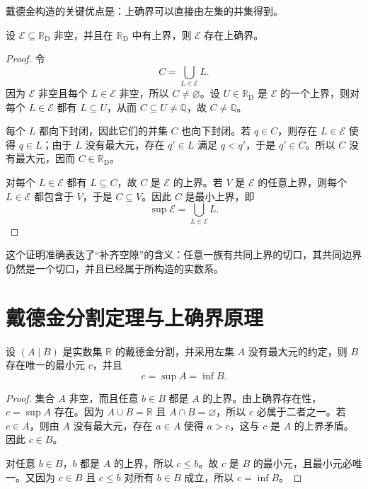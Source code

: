 \documentclass[UTF8,12pt,a4paper,fontset=fandol]{ctexbook}
\begin{document}
戴德金构造的关键优点是：上确界可以直接由左集的并集得到。

\begin{theorem}[上确界存在性]
设 $\mathcal{E}\subseteq\mathbb{R}_{\mathrm D}$ 非空，并且在 $\mathbb{R}_{\mathrm D}$ 中有上界，则 $\mathcal{E}$ 存在上确界。
\end{theorem}

\begin{proof}
令
\[
  C=\bigcup_{L\in\mathcal{E}}L.
\]
因为 $\mathcal{E}$ 非空且每个 $L\in\mathcal{E}$ 非空，所以 $C\ne\varnothing$。设 $U\in\mathbb{R}_{\mathrm D}$ 是 $\mathcal{E}$ 的一个上界，则对每个 $L\in\mathcal{E}$ 都有 $L\subseteq U$，从而 $C\subseteq U\ne\mathbb{Q}$，故 $C\ne\mathbb{Q}$。

每个 $L$ 都向下封闭，因此它们的并集 $C$ 也向下封闭。若 $q\in C$，则存在 $L\in\mathcal{E}$ 使得 $q\in L$；由于 $L$ 没有最大元，存在 $q'\in L$ 满足 $q<q'$，于是 $q'\in C$。所以 $C$ 没有最大元，因而 $C\in\mathbb{R}_{\mathrm D}$。

对每个 $L\in\mathcal{E}$ 都有 $L\subseteq C$，故 $C$ 是 $\mathcal{E}$ 的上界。若 $V$ 是 $\mathcal{E}$ 的任意上界，则每个 $L\in\mathcal{E}$ 都包含于 $V$，于是 $C\subseteq V$。因此 $C$ 是最小上界，即
\[
  \sup\mathcal{E}=\bigcup_{L\in\mathcal{E}}L.
\]
\end{proof}

这个证明准确表达了“补齐空隙”的含义：任意一族有共同上界的切口，其共同边界仍然是一个切口，并且已经属于所构造的实数系。

\section{戴德金分割定理与上确界原理}

\begin{theorem}[戴德金分割定理]\label{thm:dedekind-cut}
设 $(A\mid B)$ 是实数集 $\mathbb{R}$ 的戴德金分割，并采用左集 $A$ 没有最大元的约定，则 $B$ 存在唯一的最小元 $c$，并且
\[
  c=\sup A=\inf B.
\]
\end{theorem}

\begin{proof}
集合 $A$ 非空，而且任意 $b\in B$ 都是 $A$ 的上界。由上确界存在性，$c=\sup A$ 存在。因为 $A\cup B=\mathbb{R}$ 且 $A\cap B=\varnothing$，所以 $c$ 必属于二者之一。若 $c\in A$，则由 $A$ 没有最大元，存在 $a\in A$ 使得 $a>c$，这与 $c$ 是 $A$ 的上界矛盾。因此 $c\in B$。

对任意 $b\in B$，$b$ 都是 $A$ 的上界，所以 $c\le b$。故 $c$ 是 $B$ 的最小元，且最小元必唯一。又因为 $c\in B$ 且 $c\le b$ 对所有 $b\in B$ 成立，所以 $c=\inf B$。
\end{proof}
\end{document}
